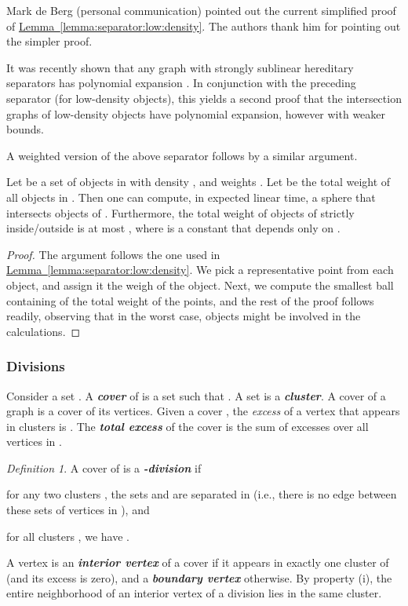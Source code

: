 \documentclass[12pt]{article}
\newcommand{\emphic}[2]{\textcolor{blue25}{\textbf{\emph{#1}}}\index{#2}}
\renewcommand{\emphic}[2]{\textbf{\emph{#1}}}
\newcommand{\emphi}[1]{\emphic{#1}{#1}}
\theoremstyle{remark}\theoremheaderfont{\sf}\theorembodyfont{\upshape}
\newtheorem{defn}[theorem]{Definition}
\numberwithin{figure}{section}\numberwithin{table}{section}\numberwithin{equation}{section}
\newcommand{\HLink}[2]{\hyperref[#2]{#1~\ref*{#2}}}
\newcommand{\lemlab}[1]{\label{lemma:#1}}
\newcommand{\lemref}[1]{\HLink{Lemma}{lemma:#1}}
\newcommand{\obslab}[1]{\label{observation:#1}}
\newcommand{\si}[1]{#1}
\begin{document}
\begin{remark}
  \obslab{improved:bound}\si{Mark de Berg} (personal communication) pointed out the current
  simplified proof of \lemref{separator:low:density}. The authors
  thank him for pointing out the simpler proof.
\end{remark}

It was recently shown that any graph with strongly sublinear
hereditary separators has polynomial expansion \cite{dn-ssspe-15}. In
conjunction with the preceding separator (for low-density objects),
this yields a second proof that the intersection graphs of low-density
objects have polynomial expansion, however with weaker bounds.

A weighted version of the above separator follows by a similar
argument.

\begin{lemma}
  \lemlab{w:s:low:density}Let  be a set of  objects in  with density
  , and weights . Let
   be the total
  weight of all objects in .  Then one can compute, in
  expected linear time, a sphere  that intersects
   objects of
  . Furthermore, the total weight of objects of 
  strictly inside/outside  is at most , where 
  is a constant that depends only on .
\end{lemma}

\begin{proof}
  The argument follows the one used in
  \lemref{separator:low:density}. We pick a representative point from
  each object, and assign it the weigh of the object. Next, we compute
  the smallest ball containing  of the total weight of
  the points, and the rest of the proof follows readily, observing
  that in the worst case,  objects might be involved in the
  calculations.
\end{proof}


\subsubsection{Divisions}


Consider a set . A \emphi{cover} of  is a set
 such
that . A set  is a
\emphi{cluster}. A cover of a graph  is a cover of its
vertices. Given a cover , the \emph{excess} of a vertex
 that appears in  clusters is . The
\emphi{total excess} of the cover  is the sum of excesses
over all vertices in .

\begin{defn}
  A cover  of  is a \emphi{-division} if
  \begin{inparaenum}[(i)]
  \item for any two clusters , the sets
     and  are separated in 
    (i.e., there is no edge between these sets of vertices in
    ), and
  \item for all clusters , we have
    .
  \end{inparaenum}

  A vertex  is an \emphi{interior vertex} of a cover
   if it appears in exactly one cluster of  (and
  its excess is zero), and a \emphi{boundary vertex} otherwise. By
  property (i), the entire neighborhood of an interior vertex of a
  division lies in the same cluster.
\end{defn}
\end{document}
